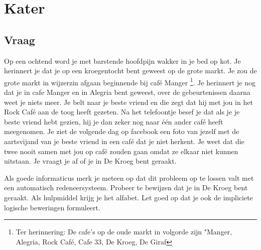 \documentclass[alternative-exam.tex]{subfiles}
\begin{document}
\chapter{Kater}
\section{Vraag}
Op een ochtend word je met barstende hoofdpijn wakker in je bed op kot. Je herinnert je dat je op een kroegentocht bent geweest op de grote markt. Je zou de grote markt in wijzerzin afgaan beginnende bij caf\'e Manger \footnote{Ter herinnering: De cafe's op de oude markt in volgorde zijn "Manger, Alegria, Rock Caf\'e, Cafe 33, De Kroeg, De Giraf}. Je herinnert je nog dat je in cafe Manger en in Alegria bent geweest, over de gebeurtenissen daarna weet je niets meer. Je belt naar je beste vriend en die zegt dat hij met jou in het Rock Caf\'e aan de toog heeft gezeten. Na het telefoontje besef je dat als je je beste vriend hebt gezien, hij je dan zeker nog naar \'e\'en ander caf\'e heeft meegenomen. Je ziet de volgende dag op facebook een foto van jezelf met de aartsvijand van je beste vriend in een caf\'e dat je niet herkent. Je weet dat die twee nooit samen met jou op caf\'e zouden gaan omdat ze elkaar niet kunnen uitstaan. Je vraagt je af of je in De Kroeg bent geraakt.

Als goede informaticus merk je meteen op dat dit probleem op te lossen valt met een automatisch redeneersysteem. Probeer te bewijzen dat je in De Kroeg bent geraakt. Als hulpmiddel krijg je het alfabet. Let goed op dat je ook de impliciete logische beweringen formuleert.
\end{document}
